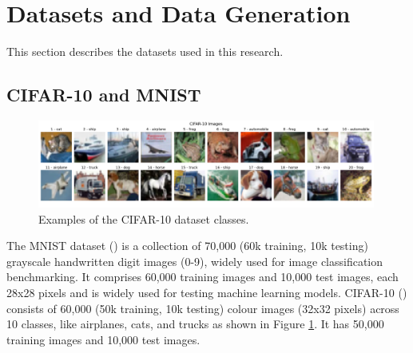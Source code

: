 
\section{Datasets and Data Generation}
\label{methods:datasets}
This section describes the datasets used in this research.

\subsection{CIFAR-10 and MNIST}

\begin{figure}[h]
\centering
\includegraphics[width=0.99\textwidth]{Figures/Methods/CIFAR-10-Images-20imgs-2rows-10cols.png}
\caption{Examples of the CIFAR-10 dataset classes.}
\label{fig:Images-20imgs-2rows-10cols}
\end{figure}

The MNIST dataset (\cite{mnist}) is a collection of 70,000 (60k training, 10k testing) grayscale handwritten digit images (0-9), widely used for image classification benchmarking. It comprises 60,000 training images and 10,000 test images, each 28x28 pixels and is widely used for testing machine learning models. CIFAR-10 (\cite{cifar10}) consists of 60,000 (50k training, 10k testing) colour images (32x32 pixels) across 10 classes, like airplanes, cats, and trucks as shown in Figure \ref{fig:Images-20imgs-2rows-10cols}. It has 50,000 training images and 10,000 test images. 

